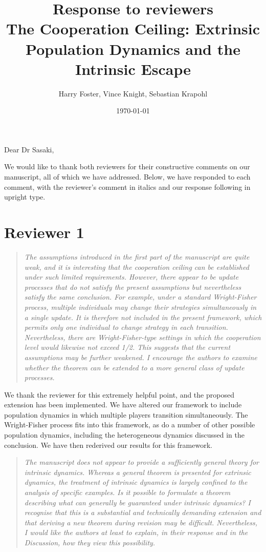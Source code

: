 \documentclass[11pt]{article}
\title{Response to reviewers\\
  \large The Cooperation Ceiling: Extrinsic Population Dynamics and the Intrinsic Escape}
\author{Harry Foster, Vince Knight, Sebastian Krapohl}
\date{\today}
\newenvironment{reviewerquote}
  {\begin{quote}\itshape}
  {\end{quote}}
\begin{document}
\maketitle

Dear Dr Sasaki,

We would like to thank both reviewers for their constructive comments on our
manuscript, all of which we have addressed. Below, we have responded to each
comment, with the reviewer's comment in italics and our response following in
upright type.

\section*{Reviewer 1}

\begin{reviewerquote}
  The assumptions introduced in the first part of the manuscript are quite weak, and it is interesting that the
  cooperation ceiling can be established under such limited requirements. However, there appear to be update
  processes that do not satisfy the present assumptions but nevertheless satisfy the same conclusion. For
  example, under a standard Wright-Fisher process, multiple individuals may change their strategies
  simultaneously in a single update. It is therefore not included in the present framework, which permits only
  one individual to change strategy in each transition. Nevertheless, there are Wright-Fisher-type settings in
  which the cooperation level would likewise not exceed 1/2. This suggests that the current assumptions may
  be further weakened. I encourage the authors to examine whether the theorem can be extended to a more
  general class of update processes. 
\end{reviewerquote}

We thank the reviewer for this extremely helpful point, and the proposed
extension has been implemented. We have altered our framework to include
population dynamics in which multiple players transition simultaneously. The
Wright-Fisher process fits into this framework, as do a number of other possible
population dynamics, including the heterogeneous dynamics discussed in the
conclusion. We have then rederived our results for this framework.

\begin{reviewerquote}
  The manuscript does not appear to provide a sufficiently general theory for intrinsic dynamics. Whereas a
  general theorem is presented for extrinsic dynamics, the treatment of intrinsic dynamics is largely confined to
  the analysis of specific examples. Is it possible to formulate a theorem describing what can generally be
  guaranteed under intrinsic dynamics? I recognise that this is a substantial and technically demanding
  extension and that deriving a new theorem during revision may be difficult. Nevertheless, I would like the
  authors at least to explain, in their response and in the Discussion, how they view this possibility.
\end{reviewerquote}
\end{document}
